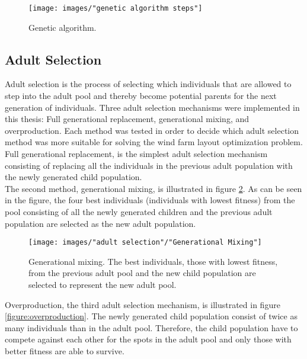 \begin{figure}[h!]
\begin{center}
\texttt{[image: images/"genetic algorithm steps"]}
\caption{Genetic algorithm.}
\label{figure:genetic algorithm steps}
\end{center}
\end{figure}


\subsection{Adult Selection}\label{subsection:adult selection}
Adult selection is the process of selecting which individuals that are allowed to step into the adult pool and thereby become potential parents for the next generation of individuals. Three adult selection mechanisms were implemented in this thesis: Full generational replacement,  generational mixing, and overproduction. Each method was tested in order to decide which adult selection method was more suitable for solving the wind farm layout optimization problem. \\

\noindent Full generational replacement, is the simplest adult selection mechanism consisting of replacing all the individuals in the previous adult population with the newly generated child population. \\

\noindent The second method, generational mixing, is illustrated in figure \ref{figure:generational mixing}. As can be seen in the figure, the four best individuals (individuals with lowest fitness) from the pool consisting of all the newly generated children and the previous adult population are selected as the new adult population. \\


\begin{figure}[h!]
\begin{center}
\texttt{[image: images/"adult selection"/"Generational Mixing"]}
\caption{Generational mixing. The best individuals, those with lowest fitness, from the previous adult pool and the new child population are selected to represent the new adult pool.}
\label{figure:generational mixing}
\end{center}
\end{figure}


\noindent Overproduction, the third adult selection mechanism, is illustrated in figure \ref{figure:overproduction}. The newly generated child population consist of twice as many individuals than in the adult pool. Therefore, the child population have to compete against each other for the spots in the adult pool and only those with better fitness are able to survive. \\


